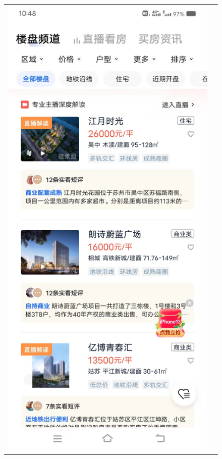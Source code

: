 \documentclass{article}
\begin{document}
\begin{figure}[htbp]
\centering
    \begin{tabular}{cc}
        \begin{minipage}[t]{2in}
        \centering
        \includegraphics[height=0.4\textheight]{./pic/贝壳找房.jpg}

\end{minipage}
\end{tabular}
\end{figure}
\end{document}
